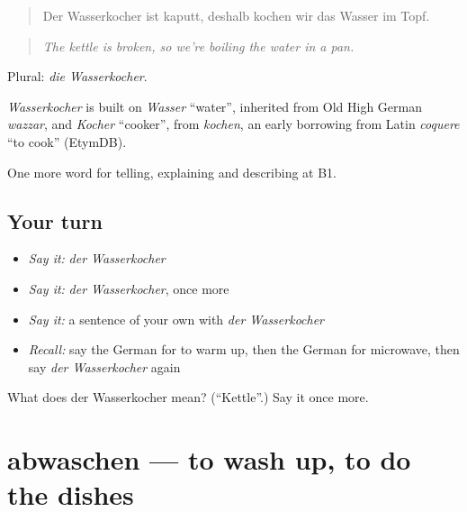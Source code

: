 \begin{quote}
Der Wasserkocher ist kaputt, deshalb kochen wir das Wasser im Topf.
\end{quote}

\begin{quote}
\emph{The kettle is broken, so we're boiling the water in a pan.}
\end{quote}

Plural: \emph{die Wasserkocher}.

\begin{cousinweb}
\emph{Wasserkocher} is built on \emph{Wasser} \textquotedblleft{}water\textquotedblright{}, inherited from Old High German \emph{wazzar}, and \emph{Kocher} \textquotedblleft{}cooker\textquotedblright{}, from \emph{kochen}, an early borrowing from Latin \emph{coquere} \textquotedblleft{}to cook\textquotedblright{} (EtymDB).
\end{cousinweb}

\begin{grammarlens}[title={What you've built}]
One more word for telling, explaining and describing at B1.
\end{grammarlens}

\subsection*{Your turn}
\begin{itemize}
\raggedright
  \item \emph{Say it:} \emph{der Wasserkocher}
  \item \emph{Say it:} \emph{der Wasserkocher}, once more
  \item \emph{Say it:} a sentence of your own with \emph{der Wasserkocher}
  \item \emph{Recall:} say the German for to warm up, then the German for microwave, then say \emph{der Wasserkocher} again
\end{itemize}

\begin{tcolorbox}[breakable,colback=teal!4,colframe=teal!35!black,title={Before you move on}]
What does der Wasserkocher mean? (\textquotedblleft{}Kettle\textquotedblright{}.) Say it once more.
\end{tcolorbox}
\section[abwaschen]{abwaschen — to wash up, to do the dishes}

\label{lesson:GE-C531-abwaschen}




